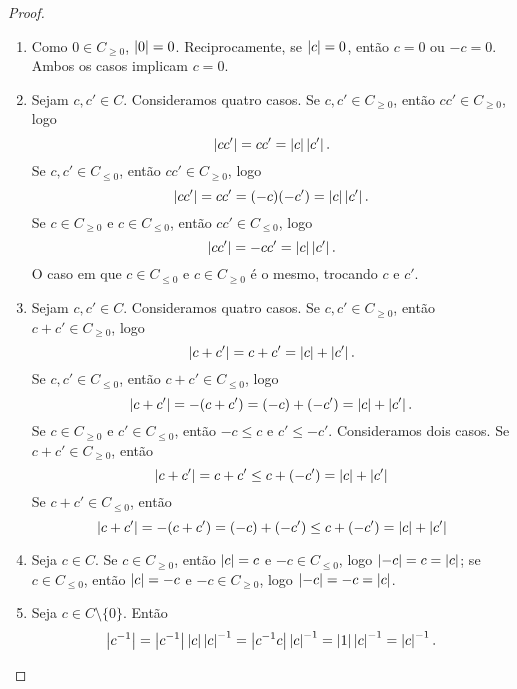 \begin{proof}
	\begin{enumerate}
	\item Como $0 \in C_{\geq 0}$, $\left\vert{0}\right\vert=0$. Reciprocamente, se $\left\vert{c}\right\vert=0$, então $c=0$ ou $-c=0$. Ambos os casos implicam $c=0$.
	
	\item Sejam $c,c' \in C$. Consideramos quatro casos. Se $c,c' \in C_{\geq 0}$, então $cc' \in C_{\geq 0}$, logo
	\begin{equation*}
	\left\vert{cc'}\right\vert = cc' = \left\vert{c}\right\vert\left\vert{c'}\right\vert.
	\end{equation*}
Se $c,c' \in C_{\leq 0}$, então $cc' \in C_{\geq 0}$, logo
	\begin{equation*}
	\left\vert{cc'}\right\vert = cc' = (-c)(-c') =\left\vert{c}\right\vert\left\vert{c'}\right\vert.
	\end{equation*}
Se $c \in C_{\geq 0}$ e $c \in C_{\leq 0}$, então $cc' \in C_{\leq 0}$, logo
	\begin{equation*}
	\left\vert{cc'}\right\vert = -cc' = \left\vert{c}\right\vert\left\vert{c'}\right\vert.
	\end{equation*}
O caso em que $c \in C_{\leq 0}$ e $c \in C_{\geq 0}$ é o mesmo, trocando $c$ e $c'$.

	\item Sejam $c,c' \in C$. Consideramos quatro casos. Se $c,c' \in C_{\geq 0}$, então $c+c' \in C_{\geq 0}$, logo
	\begin{equation*}
	\left\vert{c+c'}\right\vert = c+c' = \left\vert{c}\right\vert+\left\vert{c'}\right\vert.
	\end{equation*}
Se $c,c' \in C_{\leq 0}$, então $c+c' \in C_{\leq 0}$, logo
	\begin{equation*}
	\left\vert{c+c'}\right\vert = -(c+c') = (-c)+(-c') = \left\vert{c}\right\vert+\left\vert{c'}\right\vert.
	\end{equation*}
Se $c \in C_{\geq 0}$ e $c' \in C_{\leq 0}$, então $-c \leq c$ e $c' \leq -c'$. Consideramos dois casos. Se $c+c' \in C_{\geq 0}$, então
	\begin{equation*}
	\left\vert{c+c'}\right\vert = c+c' \leq c+(-c') = \left\vert{c}\right\vert+\left\vert{c'}\right\vert
	\end{equation*}
Se $c+c' \in C_{\leq 0}$, então
	\begin{equation*}
	\left\vert{c+c'}\right\vert = -(c+c') = (-c)+(-c') \leq c+(-c') = \left\vert{c}\right\vert+\left\vert{c'}\right\vert
	\end{equation*}
	
	\item Seja $c \in C$. Se $c \in C_{\geq 0}$, então $\left\vert{c}\right\vert=c$ e $-c \in C_{\leq 0}$, logo $\left\vert{-c}\right\vert= c = \left\vert{c}\right\vert$; se $c \in C_{\leq 0}$, então $\left\vert{c}\right\vert=-c$ e $-c \in C_{\geq 0}$, logo $\left\vert{-c}\right\vert = -c = \left\vert{c}\right\vert$.
	
	\item Seja $c \in C \setminus \{0\}$. Então
		\begin{equation*}
		\left\vert{c^{-1}}\right\vert = \left\vert{c^{-1}}\right\vert\left\vert{c}\right\vert\left\vert{c}\right\vert^{-1} = \left\vert{c^{-1}c}\right\vert\left\vert{c}\right\vert^{-1} = \left\vert{1}\right\vert\left\vert{c}\right\vert^{-1} = \left\vert{c}\right\vert^{-1}.
		\end{equation*}
	\end{enumerate}
\end{proof}


